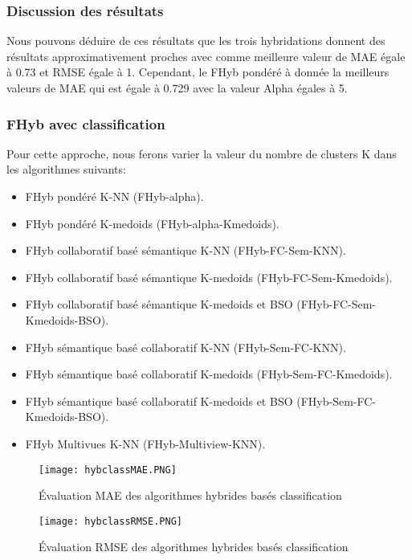 \subsubsection*{Discussion des résultats}
Nous pouvons déduire de ces résultats que les trois hybridations donnent des résultats approximativement proches avec comme meilleure valeur de MAE égale à 0.73 et RMSE égale à 1.
Cependant, le FHyb pondéré à donnée la meilleurs valeurs de MAE qui est égale à 0.729 avec la valeur Alpha égales à 5.

\subsubsection*{FHyb avec classification}
Pour cette approche, nous ferons varier la valeur du nombre de clusters K dans les algorithmes suivants:
\begin{itemize}
\item FHyb pondéré K-NN (FHyb-alpha).
\item FHyb pondéré K-medoids (FHyb-alpha-Kmedoids).
\item FHyb collaboratif basé sémantique K-NN (FHyb-FC-Sem-KNN).
\item FHyb collaboratif basé sémantique K-medoids (FHyb-FC-Sem-Kmedoids).
\item FHyb collaboratif basé sémantique K-medoids et BSO (FHyb-FC-Sem-Kmedoids-BSO).
\item FHyb sémantique basé collaboratif K-NN (FHyb-Sem-FC-KNN).
\item FHyb sémantique basé collaboratif K-medoids (FHyb-Sem-FC-Kmedoids).
\item FHyb sémantique basé collaboratif K-medoids et BSO (FHyb-Sem-FC-Kmedoids-BSO).
\item FHyb Multivues K-NN (FHyb-Multiview-KNN).
\end{itemize}
\begin{figure}[H]
	\centering
	\texttt{[image: hybclassMAE.PNG]}
	\caption{Évaluation MAE des algorithmes hybrides basés classification}
	\label{fig:hybclassMAE}
\end{figure}


\begin{figure}[H]
	\centering
	\texttt{[image: hybclassRMSE.PNG]}
	\caption{Évaluation RMSE des algorithmes hybrides basés classification}
	\label{fig:hybclassRMSE}
\end{figure}

